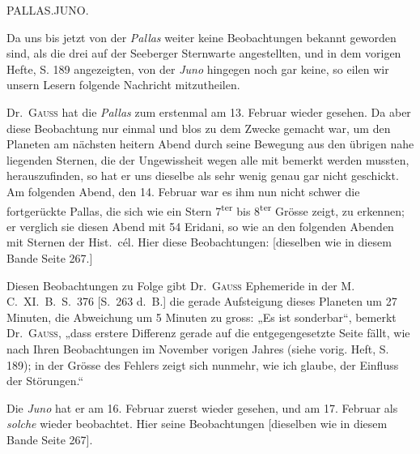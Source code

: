 \par{}\bigskip
\hypertarget{native-274-lower}{}
\begin{center}
\large PALLAS.\quad JUNO.
\end{center}

\par\indent Da uns bis jetzt von der \emph{Pallas} weiter keine Beobachtungen bekannt geworden sind, als die drei auf der Seeberger Sternwarte angestellten, und in dem vorigen Hefte, S. 189 angezeigten, von der \emph{Juno} hingegen noch gar keine, so eilen wir unsern Lesern folgende Nachricht mitzutheilen.

\par\indent Dr.\ \textsc{Gauss} hat die \emph{Pallas} zum erstenmal am 13. Februar wieder gesehen. Da aber diese Beobachtung nur einmal und blos zu dem Zwecke gemacht war, um den Planeten am nächsten heitern Abend durch seine Bewegung aus den übrigen nahe liegenden Sternen, die der Ungewissheit wegen alle mit bemerkt werden mussten, herauszufinden, so hat er uns dieselbe als sehr wenig genau gar nicht geschickt. Am folgenden Abend, den 14. Februar war es ihm nun nicht schwer die fortgerückte Pallas, die sich wie ein Stern 7\textsuperscript{ter} bis 8\textsuperscript{ter} Grösse zeigt, zu erkennen; er verglich sie diesen Abend mit 54 Eridani, so wie an den folgenden Abenden mit Sternen der Hist.\ cél. Hier diese Beobachtungen: [dieselben wie in diesem Bande Seite 267.]

\par\indent Diesen Beobachtungen zu Folge gibt Dr.\ \textsc{Gauss} Ephemeride in der M.\,C.\ XI.\ B.\ S.\ 376 [S.\ 263 d.\ B.] die gerade Aufsteigung dieses Planeten um 27 Minuten, die Abweichung um 5 Minuten zu gross: „Es ist sonderbar“, bemerkt Dr.\ \textsc{Gauss}, „dass erstere Differenz gerade auf die entgegengesetzte Seite fällt, wie nach Ihren Beobachtungen im November vorigen Jahres (siehe vorig. Heft, S. 189); in der Grösse des Fehlers zeigt sich nunmehr, wie ich glaube, der Einfluss der Störungen.“

\par\indent Die \emph{Juno} hat er am 16. Februar zuerst wieder gesehen, und am 17. Februar als \emph{solche} wieder beobachtet. Hier seine Beobachtungen [dieselben wie in diesem Bande Seite 267].

